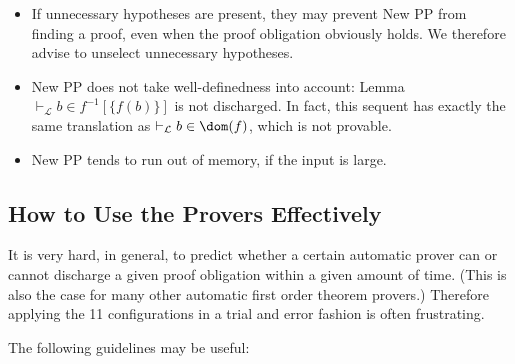 \begin{description}
\begin{itemize}
		\item If unnecessary hypotheses are present, they may prevent New PP from finding a proof, even when the proof obligation obviously holds. We therefore advise to unselect unnecessary hypotheses.
		\item New PP does not take well-definedness into account:
	        Lemma $\vdash_{\mathcal L} b \in f^{-1} [\{f(b)\}]$ is not discharged. In fact, this sequent has exactly the same translation as $\vdash_{\mathcal L} b \in\dom(f)$, which is not provable. 
		\item New PP tends to run out of memory, if the input is large. 
	\end{itemize}
\end{description}

\subsection{How to Use the Provers Effectively}
\label{ref:use_provers_effectively}

It is very hard, in general, to predict whether a certain automatic prover can or cannot discharge a given proof obligation within a given amount of time. (This is also the case for many other automatic first order theorem provers.) Therefore applying the 11 configurations in a trial and error fashion is often frustrating.

The following guidelines may be useful:

